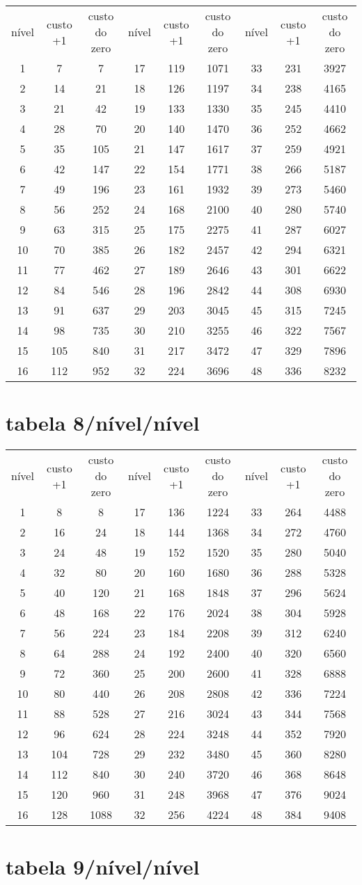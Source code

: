 \begin{longtable}{|c|c|c|c|c|c|c|c|c|}
    nível&custo +1&custo do zero&nível&custo +1&custo do zero&nível&custo +1&custo do zero\tabularnewline 
     1 & 7 & 7 & 17 & 119 & 1071 & 33 & 231 & 3927 \tabularnewline 
     2 & 14 & 21 & 18 & 126 & 1197 & 34 & 238 & 4165 \tabularnewline 
     3 & 21 & 42 & 19 & 133 & 1330 & 35 & 245 & 4410 \tabularnewline 
     4 & 28 & 70 & 20 & 140 & 1470 & 36 & 252 & 4662 \tabularnewline 
     5 & 35 & 105 & 21 & 147 & 1617 & 37 & 259 & 4921 \tabularnewline 
     6 & 42 & 147 & 22 & 154 & 1771 & 38 & 266 & 5187 \tabularnewline 
     7 & 49 & 196 & 23 & 161 & 1932 & 39 & 273 & 5460 \tabularnewline 
     8 & 56 & 252 & 24 & 168 & 2100 & 40 & 280 & 5740 \tabularnewline 
     9 & 63 & 315 & 25 & 175 & 2275 & 41 & 287 & 6027 \tabularnewline 
     10 & 70 & 385 & 26 & 182 & 2457 & 42 & 294 & 6321 \tabularnewline 
     11 & 77 & 462 & 27 & 189 & 2646 & 43 & 301 & 6622 \tabularnewline 
     12 & 84 & 546 & 28 & 196 & 2842 & 44 & 308 & 6930 \tabularnewline 
     13 & 91 & 637 & 29 & 203 & 3045 & 45 & 315 & 7245 \tabularnewline 
     14 & 98 & 735 & 30 & 210 & 3255 & 46 & 322 & 7567 \tabularnewline 
     15 & 105 & 840 & 31 & 217 & 3472 & 47 & 329 & 7896 \tabularnewline 
     16 & 112 & 952 & 32 & 224 & 3696 & 48 & 336 & 8232 \tabularnewline  
\end{longtable} \section{tabela 8/nível/nível} 
\begin{longtable}{|c|c|c|c|c|c|c|c|c|}
    nível&custo +1&custo do zero&nível&custo +1&custo do zero&nível&custo +1&custo do zero\tabularnewline 
     1 & 8 & 8 & 17 & 136 & 1224 & 33 & 264 & 4488 \tabularnewline 
     2 & 16 & 24 & 18 & 144 & 1368 & 34 & 272 & 4760 \tabularnewline 
     3 & 24 & 48 & 19 & 152 & 1520 & 35 & 280 & 5040 \tabularnewline 
     4 & 32 & 80 & 20 & 160 & 1680 & 36 & 288 & 5328 \tabularnewline 
     5 & 40 & 120 & 21 & 168 & 1848 & 37 & 296 & 5624 \tabularnewline 
     6 & 48 & 168 & 22 & 176 & 2024 & 38 & 304 & 5928 \tabularnewline 
     7 & 56 & 224 & 23 & 184 & 2208 & 39 & 312 & 6240 \tabularnewline 
     8 & 64 & 288 & 24 & 192 & 2400 & 40 & 320 & 6560 \tabularnewline 
     9 & 72 & 360 & 25 & 200 & 2600 & 41 & 328 & 6888 \tabularnewline 
     10 & 80 & 440 & 26 & 208 & 2808 & 42 & 336 & 7224 \tabularnewline 
     11 & 88 & 528 & 27 & 216 & 3024 & 43 & 344 & 7568 \tabularnewline 
     12 & 96 & 624 & 28 & 224 & 3248 & 44 & 352 & 7920 \tabularnewline 
     13 & 104 & 728 & 29 & 232 & 3480 & 45 & 360 & 8280 \tabularnewline 
     14 & 112 & 840 & 30 & 240 & 3720 & 46 & 368 & 8648 \tabularnewline 
     15 & 120 & 960 & 31 & 248 & 3968 & 47 & 376 & 9024 \tabularnewline 
     16 & 128 & 1088 & 32 & 256 & 4224 & 48 & 384 & 9408 \tabularnewline  
\end{longtable} \section{tabela 9/nível/nível} 
